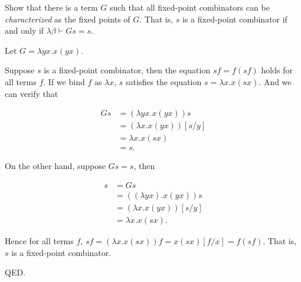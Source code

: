 \documentclass{homework}
\begin{document}
\begin{problem}
  Show that there is a term $G$ such that all fixed-point combinators can be
  \emph{characterized} as the fixed points of $G$.
  That is, $s$ is a fixed-point combinator if and only if
  $\lambda\beta \vdash G s = s$.
\end{problem}

\begin{solution}

  Let $G = \lambda yx.x(yx)$.

  Suppose $s$ is a fixed-point combinator,
  then the equation $sf = f(sf)$ holds for all terms $f$.
  If we bind $f$ as $\lambda x$, $s$ satisfies the equation $s = \lambda x.x(sx)$.
  And we can verify that

  \begin{align*}
    Gs & = (\lambda yx.x(yx))s \\
    & = (\lambda x.x(yx))[s/y] \\
    & = \lambda x.x(sx) \\
    & = s.
  \end{align*}

  On the other hand, suppose $G s = s$, then

  \begin{align*}
    s & = G s \\
    & = ((\lambda yx).x(yx))s \\
    & = (\lambda x.x(yx))[s/y] \\
    & = \lambda x.x(sx).
  \end{align*}

  Hence for all terms $f$,
  $sf = (\lambda x.x(sx))f = x(sx)[f/x] = f(sf)$.
  That is, $s$ is a fixed-point combinator.

  QED.

\end{solution}
\end{document}
